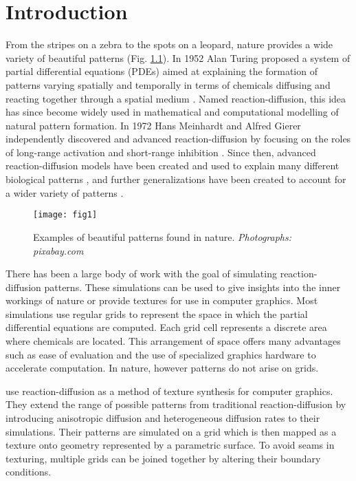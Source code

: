 \chapter{Introduction}
From the stripes on a zebra to the spots on a leopard, nature provides a wide variety of beautiful patterns (Fig. \ref{fig:naturalPatterns1}). In 1952 Alan Turing proposed a system of partial differential equations (PDEs) aimed at explaining the formation of patterns varying spatially and temporally in terms of chemicals diffusing and reacting together through a spatial medium \citep{Turing1952}. Named reaction-diffusion, this idea has since become widely used in mathematical and computational modelling of natural pattern formation. In 1972 Hans Meinhardt and Alfred Gierer independently discovered and advanced reaction-diffusion by focusing on the roles of long-range activation and short-range inhibition \citep{gierer1972}. Since then, advanced reaction-diffusion models have been created and used to explain many different biological patterns \citep{GarzonAlvarado2011, fowler1992modeling, lefevre2010reaction, meinhardt2009}, and further generalizations have been created to account for a wider variety of patterns \citep{KONDO2017120}.

\begin{figure}[H]
  \centering
  \texttt{[image: fig1]}
  \caption{Examples of beautiful patterns found in nature. \textit{Photographs: pixabay.com}}
  \label{fig:naturalPatterns1}
\end{figure}

There has been a large body of work with the goal of simulating reaction-diffusion patterns. These simulations can be used to give insights into the inner workings of nature or provide textures for use in computer graphics. Most simulations use regular grids to represent the space in which the partial differential equations are computed. Each grid cell represents a discrete area where chemicals are located. This arrangement of space offers many advantages such as ease of evaluation and the use of specialized graphics hardware to accelerate computation. In nature, however patterns do not arise on grids. 

\citet{Witkin1991} use reaction-diffusion as a method of texture synthesis for computer graphics. They extend the range of possible patterns from traditional reaction-diffusion by introducing anisotropic diffusion and heterogeneous diffusion rates to their simulations. Their patterns are simulated on a grid which is then mapped as a texture onto geometry represented by a parametric surface.  To avoid seams in texturing, multiple grids can be joined together by altering their boundary conditions. 

